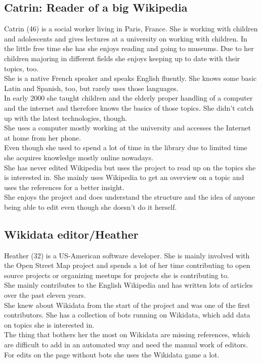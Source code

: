 \subsection{Catrin: Reader of a big Wikipedia}
Catrin (46) is a social worker living in Paris, France. She is working with children and adolescents and gives lectures at a university on working with children. In the little free time she has she enjoys reading and going to museums. Due to her children majoring in different fields she enjoys keeping up to date with their topics, too. \\
She is a native French speaker and speaks English fluently. She knows some basic Latin and Spanish, too, but rarely uses those languages. \\
In early 2000 she taught children and the elderly proper handling of a computer and the internet and therefore knows the basics of those topics. She didn't catch up with the latest technologies, though. \\
She uses a computer mostly working at the university and accesses the Internet at home from her phone. \\
Even though she used to spend a lot of time in the library due to limited time she acquires knowledge mostly online nowadays. \\
She has never edited Wikipedia but uses the project to read up on the topics she is interested in. She mainly uses Wikipedia to get an overview on a topic and uses the references for a better insight. \\
She enjoys the project and does understand the structure and the idea of anyone being able to edit even though she doesn't do it herself. \\


\subsection{Wikidata editor/Heather}
Heather (32) is a US-American software developer. She is mainly involved with the Open Street Map project and spends a lot of her time contributing to open source projects or organizing meetups for projects she is contributing to. \\
She mainly contributes to the English Wikipedia and has written lots of articles over the past eleven years. \\
She knew about Wikidata from the start of the project and was one of the first contributors. She has a collection of bots running on Wikidata, which add data on topics she is interested in. \\
The thing that bothers her the most on Wikidata are missing references, which are difficult to add in an automated way and need the manual work of editors. For edits on the page without bots she uses the Wikidata game a lot. 
